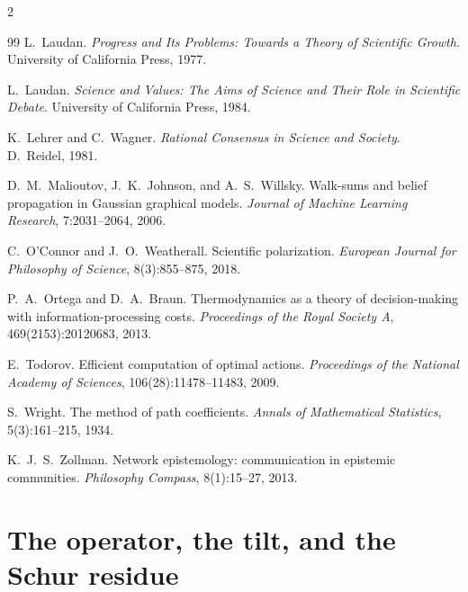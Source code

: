 \documentclass[11pt]{article}
\begin{document}
\begin{multicols}{2}
\begin{thebibliography}{99}
L.~Laudan.
\emph{Progress and Its Problems: Towards a Theory of Scientific Growth}.
University of California Press, 1977.

L.~Laudan.
\emph{Science and Values: The Aims of Science and Their Role in Scientific Debate}.
University of California Press, 1984.

K.~Lehrer and C.~Wagner.
\emph{Rational Consensus in Science and Society}. D.~Reidel, 1981.

D.~M.~Malioutov, J.~K.~Johnson, and A.~S.~Willsky.
Walk-sums and belief propagation in Gaussian graphical models.
\emph{Journal of Machine Learning Research}, 7:2031--2064, 2006.

C.~O'Connor and J.~O.~Weatherall.
Scientific polarization. \emph{European Journal for Philosophy of Science}, 8(3):855--875, 2018.

P.~A.~Ortega and D.~A.~Braun.
Thermodynamics as a theory of decision-making with information-processing costs.
\emph{Proceedings of the Royal Society A}, 469(2153):20120683, 2013.

E.~Todorov.
Efficient computation of optimal actions.
\emph{Proceedings of the National Academy of Sciences}, 106(28):11478--11483, 2009.

S.~Wright.
The method of path coefficients. \emph{Annals of Mathematical Statistics}, 5(3):161--215, 1934.

K.~J.~S.~Zollman.
Network epistemology: communication in epistemic communities.
\emph{Philosophy Compass}, 8(1):15--27, 2013.

\end{thebibliography}
\end{multicols}

\clearpage
\appendix
\section{The operator, the tilt, and the Schur residue}
\label{app:operator}
\end{document}

